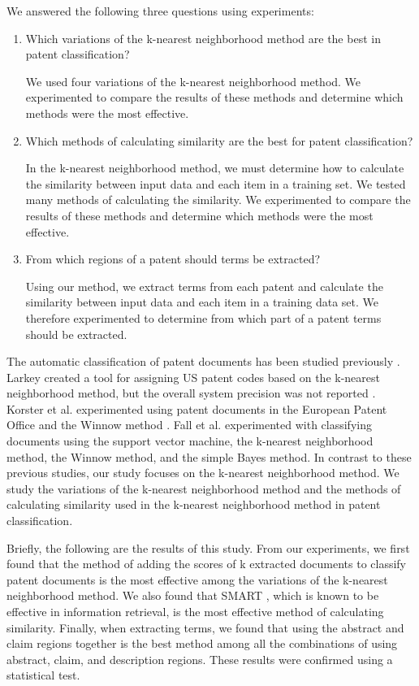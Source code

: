 \documentclass[english]{jnlp_1.2c}
\begin{document}
We answered the following three questions using
experiments:
\begin{enumerate}
\item 
Which variations of 
the k-nearest neighborhood method are the best in patent classification?

We used four variations of 
the k-nearest neighborhood method. 
We experimented to compare 
the results of these methods 
and determine which methods were the most effective.

\item 
Which methods of calculating 
similarity are the best for patent classification?

In the k-nearest neighborhood method,
we must determine how to calculate 
the similarity between input data and 
each item in a training set. 
We tested many methods of 
calculating the similarity. 
We experimented to compare 
the results of these methods 
and determine which methods were the most effective.

\item 
From which regions of a patent 
should terms be extracted?

Using our method, 
we extract terms from each patent 
and calculate the similarity between input data and 
each item in a training data set.
We therefore experimented to 
determine from
which part of a patent 
terms should be extracted.
\end{enumerate}

The automatic classification of patent documents 
has been studied previously \cite{Larkey99_2,koster-multiclassification_2,Fall03_2}.
Larkey created a tool for 
assigning US patent codes based on the k-nearest neighborhood method, 
but the overall system precision was not reported \cite{Larkey99_2}. 
Korster et al. experimented using 
patent documents in the European Patent Office
and the Winnow method \cite{koster-multiclassification_2}. 
Fall et al. experimented 
with classifying documents using
the support vector machine, 
the k-nearest neighborhood method, 
the Winnow method, 
and the simple Bayes method. 
In contrast to these previous studies, 
our study focuses on the k-nearest neighborhood method. 
We study the variations of 
the k-nearest neighborhood method 
and the methods of calculating 
similarity used in the k-nearest neighborhood method 
in patent classification. 

Briefly, 
the following are the results of this study. 
From our experiments, 
we first found that 
the method of adding the scores of 
k extracted documents 
to classify patent documents is the most effective 
among the variations of the k-nearest neighborhood method. 
We also found that 
SMART \cite{Singhal96_2,smart97_2}, which is known 
to be effective in information retrieval, 
is the most effective 
method of calculating similarity.    
Finally, when extracting terms, 
we found that 
using the abstract and claim regions together
is the best method among 
all the combinations of using
abstract, claim, and description regions.
These results were confirmed using a statistical test.
\end{document}
